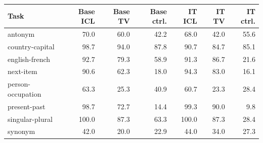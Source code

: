 \begin{tabular}{lrrrrrr}
\toprule
Task & Base ICL & Base TV & Base ctrl. & IT ICL & IT TV & IT ctrl. \\
\midrule
antonym & 70.0 & 60.0 & 42.2 & 68.0 & 42.0 & 55.6 \\
country-capital & 98.7 & 94.0 & 87.8 & 90.7 & 84.7 & 85.1 \\
english-french & 92.7 & 79.3 & 58.9 & 91.3 & 86.7 & 21.6 \\
next-item & 90.6 & 62.3 & 18.0 & 94.3 & 83.0 & 16.1 \\
person-occupation & 63.3 & 25.3 & 40.9 & 60.7 & 23.3 & 28.4 \\
present-past & 98.7 & 72.7 & 14.4 & 99.3 & 90.0 & 9.8 \\
singular-plural & 100.0 & 87.3 & 63.3 & 100.0 & 87.3 & 28.4 \\
synonym & 42.0 & 20.0 & 22.9 & 44.0 & 34.0 & 27.3 \\
\bottomrule
\end{tabular}
